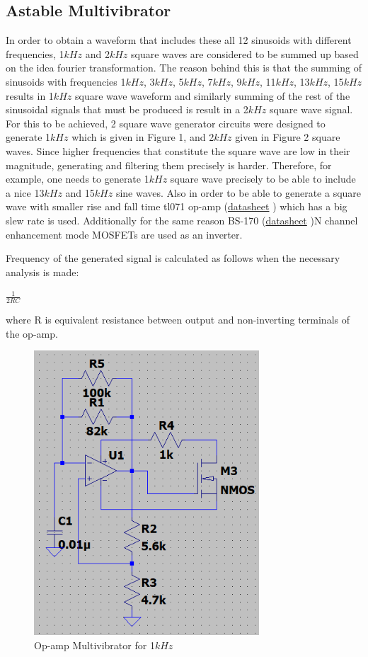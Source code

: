 \documentclass[letterpaper,12pt]{article}
\begin{document}
\subsection{Astable Multivibrator}
In order to obtain a waveform that includes these all 12 sinusoids with different frequencies, 1\(kHz\) and 2\(kHz\) square waves are considered to be summed up based on the idea fourier transformation. The reason behind this is that the summing of sinusoids with frequencies 1\(kHz\), 3\(kHz\), 5\(kHz\), 7\(kHz\), 9\(kHz\), 11\(kHz\), 13\(kHz\), 15\(kHz\) results in 1\(kHz\) square wave waveform and similarly summing of the rest of the sinusoidal signals that must be produced is result in a 2\(kHz\) square wave signal. For this to be achieved, 2 square wave generator circuits were designed to generate 1\(kHz\) which is given in Figure 1, and 2\(kHz\) given in Figure 2 square waves. Since higher frequencies that constitute the square wave are low in their magnitude, generating and filtering them precisely is harder. Therefore, for example, one needs to generate 1\(kHz\) square wave precisely to be able to include a nice 13\(kHz\) and 15\(kHz\) sine waves.
Also in order to be able to generate a square wave with smaller rise and fall time tl071 op-amp (\href{https://www.st.com/resource/en/datasheet/tl071.pdf}{datasheet} ) which has a big slew rate is used. Additionally for the same reason BS-170 (\href{https://www.onsemi.com/pdf/datasheet/mmbf170-d.pdf}{datasheet} )N channel enhancement mode MOSFETs are used as an inverter.  

Frequency of the generated signal is calculated as follows when the necessary analysis is made:
\begin{center}
    $ \frac{1}{2RC} $
\end{center}
where R is equivalent resistance between output and non-inverting terminals of the op-amp.
\begin{figure}[H]
    \centering
    \includegraphics[width = 0.75\textwidth]{1K.png}
    \caption{Op-amp Multivibrator for 1\(kHz\)}
\end{figure} 
\end{document}
